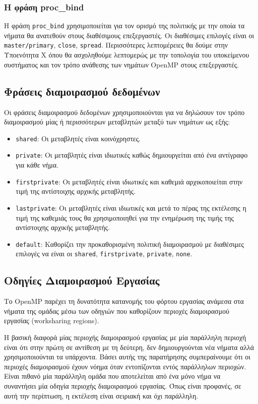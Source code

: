 \subsubsection{Η φράση proc\_bind}
Η φράση \texttt{proc\_bind} χρησιμοποιείται για τον ορισμό της πολιτικής με την οποία τα νήματα θα ανατεθούν στους διαθέσιμους επεξεργαστές. Οι διαθέσιμες επιλογές είναι οι \texttt{master/primary}, \texttt{close}, \texttt{spread}. Περισσότερες λεπτομέρειες θα δούμε στην Υποενότητα Χ όπου θα ασχοληθούμε λεπτομερώς με την τοπολογία του υποκείμενου συστήματος και τον τρόπο ανάθεσης των νημάτων OpenMP στους επεξεργαστές.


\subsection{Φράσεις διαμοιρασμού δεδομένων}
Οι φράσεις διαμοιρασμού δεδομένων χρησιμοποιούνται για να δηλώσουν τον τρόπο διαμοιρασμού μίας ή περισσότερων μεταβλητών μεταξύ των νημάτων ως εξής:
\begin{itemize}
	\item \texttt{shared}: Οι μεταβλητές είναι κοινόχρηστες.
	\item \texttt{private}: Οι μεταβλητές είναι ιδιωτικές καθώς δημιουργείται από ένα αντίγραφο για κάθε νήμα.
	\item \texttt{firstprivate}: Οι μεταβλητές είναι ιδιωτικές και καθεμιά αρχικοποιείται στην τιμή της αντίστοιχης αρχικής μεταβλητής.
	\item \texttt{lastprivate}: Οι μεταβλητές είναι ιδιωτικές και μετά το πέρας της εκτέλεσης η τιμή της καθεμιάς τους θα χρησιμοποιηθεί για την ενημέρωση της τιμής της αντίστοιχης αρχικής μεταβλητής.
	\item \texttt{default}: Καθορίζει την προκαθορισμένη πολιτική διαμοιρασμού με διαθέσιμες επιλογές να είναι οι \texttt{shared}, \texttt{firstprivate}, \texttt{private}, \texttt{none}.
\end{itemize}


\subsection{Οδηγίες Διαμοιρασμού Εργασίας}
Το OpenMP παρέχει τη δυνατότητα κατανομής του φόρτου εργασίας ανάμεσα στα νήματα της ομάδας μέσω των οδηγιών που καθορίζουν περιοχές διαμοιρασμού εργασίας (worksharing regions).

Η βασική διαφορά μίας περιοχής διαμοιρασμού εργασίας με μία παράλληλη περιοχή είναι ότι στην πρώτη σε αντίθεση με τη δεύτερη, δεν δημιουργούνται νέα νήματα αλλά χρησιμοποιούνται τα υπάρχοντα. Βάσει αυτής της παρατήρησης συμπεραίνουμε ότι οι περιοχές διαμοιρασμού έχουν νόημα όταν εντοπίζονται εντός παράλληλων περιοχών. Είναι πιθανό μία παράλληλη ομάδα που αποτελείται από ένα μόνο νήμα να συναντήσει μία οδηγία περιοχής διαμοιρασμού εργασίας. Όπως είναι προφανές, σε αυτή την περίπτωση, η εκτέλεση είναι σειριακή και όχι παράλληλη.

